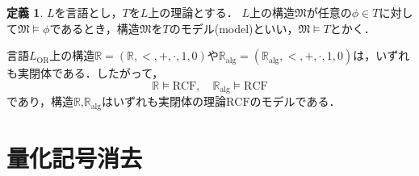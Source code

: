 \documentclass[uplatex, dvipdfmx]{jsarticle}
\newcommand{\R}{\mathbb{R}}
\newcommand{\Ralg}{\mathbb{R}_\mathrm{alg}}
\newcommand{\M}{\mathfrak{M}}
\newcommand{\RCF}{\mathrm{RCF}}
\theoremstyle{definition}
\newtheorem{definition}{定義}[section]
\begin{document}
\begin{definition}
     $L$を言語とし，$T$を$L$上の理論とする．
     $L$上の構造$\M$が任意の$\phi \in T$に対して$\M\models \phi$であるとき，構造$\M$を$T$のモデル(model)といい，$\M \models T$とかく．
\end{definition}

言語$L_\mathrm{OR}$上の構造$\R=(\R,<,+,\cdot,1,0)$や$\Ralg=(\Ralg,<,+,\cdot,1,0)$は，いずれも実閉体である．したがって，
\[
     \R \models \RCF, \quad \Ralg \models \RCF
\]
であり，構造$\R$,$\Ralg$はいずれも実閉体の理論$\RCF$のモデルである．

\section{量化記号消去}



\end{document}

